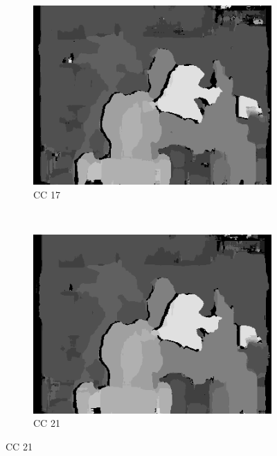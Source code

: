\begin{figure}
\begin{subfigure}[b]{0.23\textwidth}
    \includegraphics[width=\textwidth]{images/stereo-pairs/tsukuba_dual_crosschecked_17.png}
    \caption{CC 17}
  \end{subfigure}
  ~
  \begin{subfigure}[b]{0.23\textwidth}
    \centering
    \includegraphics[width=\textwidth]{images/stereo-pairs/tsukuba_dual_crosschecked_21.png}
    \caption{CC 21}
  \end{subfigure}


\end{figure}

